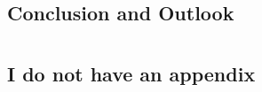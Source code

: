 \documentclass[UKenglish]{texmex/uiomasterthesis}
\begin{document}
\chapter{Conclusion and Outlook}







\backmatter{}


\part*{}






\appendix




\chapter{I do not have an appendix}

\end{document}
